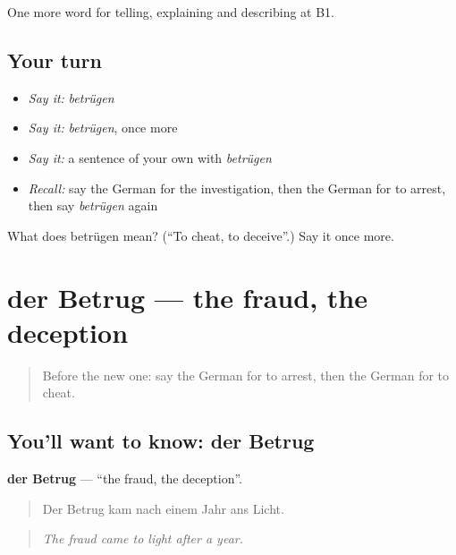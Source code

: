 \begin{grammarlens}[title={What you've built}]
One more word for telling, explaining and describing at B1.
\end{grammarlens}

\subsection*{Your turn}
\begin{itemize}
\raggedright
  \item \emph{Say it:} \emph{betrügen}
  \item \emph{Say it:} \emph{betrügen}, once more
  \item \emph{Say it:} a sentence of your own with \emph{betrügen}
  \item \emph{Recall:} say the German for the investigation, then the German for to arrest, then say \emph{betrügen} again
\end{itemize}

\begin{tcolorbox}[breakable,colback=teal!4,colframe=teal!35!black,title={Before you move on}]
What does betrügen mean? (\textquotedblleft{}To cheat, to deceive\textquotedblright{}.) Say it once more.
\end{tcolorbox}
\section[der Betrug]{der Betrug — the fraud, the deception}

\label{lesson:GE-C285-betrug}



\begin{quote}
Before the new one: say the German for to arrest, then the German for to cheat.
\end{quote}

\subsection*{You'll want to know: der Betrug}
\textbf{der Betrug} — \textquotedblleft{}the fraud, the deception\textquotedblright{}.

\begin{quote}
Der Betrug kam nach einem Jahr ans Licht.
\end{quote}

\begin{quote}
\emph{The fraud came to light after a year.}
\end{quote}

